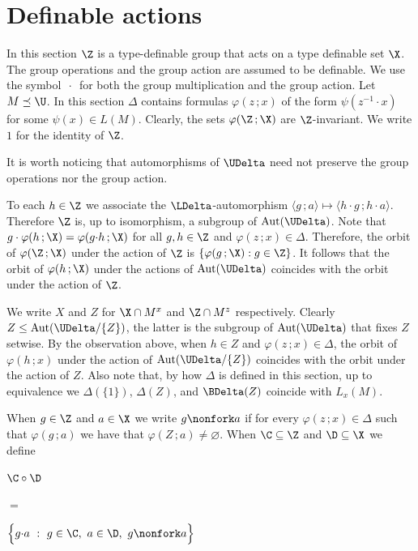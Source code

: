 \section{Definable actions}
\label{definable}


\def\ceq#1#2#3{\noindent\parbox[t]{15ex}{$\displaystyle #1$}\parbox{6ex}{\hfil $#2$}{$\displaystyle #3$}}

In this section $\Z$ is a type-definable group that acts on a type definable set $\X$.
The group operations and the group action are assumed to be definable.
We use the symbol $\,\cdot\,$ for both the group multiplication and the group action.
Let $M\preceq\U$.
In this section $\Delta$ contains formulas $\varphi(z\,;x)$ of the form $\psi(z^{-1}\!\cdot x)$ for some $\psi(x)\in L(M)$.
Clearly, the sets $\varphi(\Z\,;\X)$ are $\Z$-invariant.
We write $1$ for the identity of $\Z$.

It is worth noticing that automorphisms of $\UDelta$ need not preserve the group operations nor the group action.

To each $h\in\Z$ we associate the $\LDelta$-automorphism $\langle g\,;a\rangle\mapsto\langle h{\cdot}g\,;h{\cdot}a\rangle$.
Therefore $\Z$ is, up to isomorphism, a subgroup of ${\rm Aut}(\UDelta)$.
Note that $g\cdot\varphi(h\,;\X)=\varphi(g{\cdot}h\,;\X)$ for all $g,h\in\Z$ and $\varphi(z\,;x)\in\Delta$.
Therefore, the orbit of $\varphi(\Z\,;\X)$ under the action of $\Z$ is $\{\varphi(g\,;\X) : g\in\Z\}$.
It follows that the orbit of $\varphi(h\,;\X)$ under the actions of ${\rm Aut}(\UDelta)$ coincides with the orbit under the action of $\Z$.

We write $X$ and $Z$ for $\X\cap M^x$ and $\Z\cap M^z$ respectively.
Clearly $Z\le{\rm Aut}(\UDelta/\{Z\})$, the latter is the subgroup of ${\rm Aut}(\UDelta)$ that fixes $Z$ setwise.
By the observation above, when $h\in Z$ and $\varphi(z\,;x)\in\Delta$, the orbit of $\varphi(h\,;x)$ under the action of ${\rm Aut}(\UDelta/\{Z\})$ coincides with the orbit under the action of $Z$.
Also note that, by how $\Delta$ is defined in this section, up to equivalence we $\Delta(\{1\})$, $\Delta(Z)$, and $\BDelta(Z)$ coincide with $L_x(M)$.

When $g\in\Z$ and $a\in\X$ we write $g\nonfork a$ if for every $\varphi(z\,;x)\in\Delta$ such that $\varphi(g\,;a)$ we have that $\varphi(Z\,;a)\neq\varnothing$.
When $\C\subseteq\Z$ and $\D\subseteq\X$ we define

\ceq{\hfill\C\circ\D}{=}{\Big\{g{\cdot}a\ :\ g\in\C,\ a\in\D,\ g\nonfork a\Big\}}

